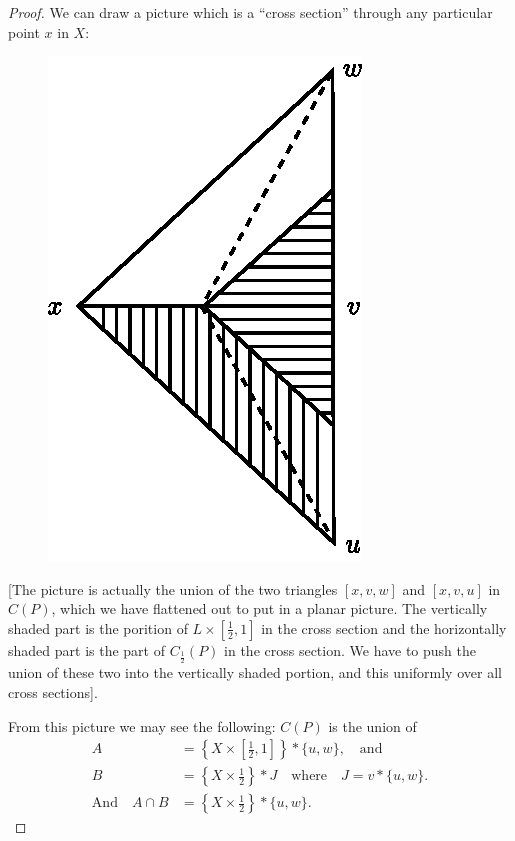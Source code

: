 \begin{proof}
We can draw a picture which is a ``cross section'' through any particular point $x$ in $X$:
\begin{figure}[H]
\centering
\includegraphics{figure/fig17.eps}
\end{figure}\pageoriginale

[The picture is actually the union of the two triangles $[x,v,w]$ and $[x,v,u]$ in $C(P)$, which we have flattened out to put in a planar picture. The vertically shaded part is the porition of $L\times[\frac{1}{2},1]$ in the cross section and the horizontally shaded part is the part of $C_{\frac{1}{2}}(P)$ in the cross section. We have to push the union of these two into the vertically shaded portion, and this uniformly over all cross sections].

From this picture we may see the following: $C(P)$ is the union of 
\begin{align*}
A &= \left\{X\times\left[\frac{1}{2},1\right]\right\}\ast\{u,w\},\quad\text{and}\\
B &= \left\{X\times\frac{1}{2}\right\}\ast J\quad\text{where}\quad J=v\ast\{u,w\}.\\
\text{And}\quad A\cap B &= \left\{X\times\frac{1}{2}\right\}\ast \{u,w\}.
\end{align*}


\end{proof}
